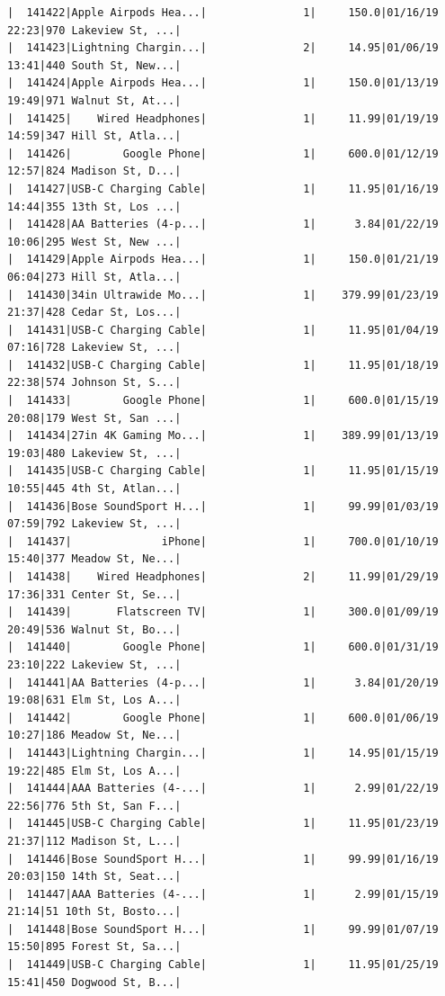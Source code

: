 \documentclass[
  letterpaper,
  DIV=11,
  numbers=noendperiod]{scrartcl}
\begin{document}
\begin{verbatim}
|  141422|Apple Airpods Hea...|               1|     150.0|01/16/19 22:23|970 Lakeview St, ...|
|  141423|Lightning Chargin...|               2|     14.95|01/06/19 13:41|440 South St, New...|
|  141424|Apple Airpods Hea...|               1|     150.0|01/13/19 19:49|971 Walnut St, At...|
|  141425|    Wired Headphones|               1|     11.99|01/19/19 14:59|347 Hill St, Atla...|
|  141426|        Google Phone|               1|     600.0|01/12/19 12:57|824 Madison St, D...|
|  141427|USB-C Charging Cable|               1|     11.95|01/16/19 14:44|355 13th St, Los ...|
|  141428|AA Batteries (4-p...|               1|      3.84|01/22/19 10:06|295 West St, New ...|
|  141429|Apple Airpods Hea...|               1|     150.0|01/21/19 06:04|273 Hill St, Atla...|
|  141430|34in Ultrawide Mo...|               1|    379.99|01/23/19 21:37|428 Cedar St, Los...|
|  141431|USB-C Charging Cable|               1|     11.95|01/04/19 07:16|728 Lakeview St, ...|
|  141432|USB-C Charging Cable|               1|     11.95|01/18/19 22:38|574 Johnson St, S...|
|  141433|        Google Phone|               1|     600.0|01/15/19 20:08|179 West St, San ...|
|  141434|27in 4K Gaming Mo...|               1|    389.99|01/13/19 19:03|480 Lakeview St, ...|
|  141435|USB-C Charging Cable|               1|     11.95|01/15/19 10:55|445 4th St, Atlan...|
|  141436|Bose SoundSport H...|               1|     99.99|01/03/19 07:59|792 Lakeview St, ...|
|  141437|              iPhone|               1|     700.0|01/10/19 15:40|377 Meadow St, Ne...|
|  141438|    Wired Headphones|               2|     11.99|01/29/19 17:36|331 Center St, Se...|
|  141439|       Flatscreen TV|               1|     300.0|01/09/19 20:49|536 Walnut St, Bo...|
|  141440|        Google Phone|               1|     600.0|01/31/19 23:10|222 Lakeview St, ...|
|  141441|AA Batteries (4-p...|               1|      3.84|01/20/19 19:08|631 Elm St, Los A...|
|  141442|        Google Phone|               1|     600.0|01/06/19 10:27|186 Meadow St, Ne...|
|  141443|Lightning Chargin...|               1|     14.95|01/15/19 19:22|485 Elm St, Los A...|
|  141444|AAA Batteries (4-...|               1|      2.99|01/22/19 22:56|776 5th St, San F...|
|  141445|USB-C Charging Cable|               1|     11.95|01/23/19 21:37|112 Madison St, L...|
|  141446|Bose SoundSport H...|               1|     99.99|01/16/19 20:03|150 14th St, Seat...|
|  141447|AAA Batteries (4-...|               1|      2.99|01/15/19 21:14|51 10th St, Bosto...|
|  141448|Bose SoundSport H...|               1|     99.99|01/07/19 15:50|895 Forest St, Sa...|
|  141449|USB-C Charging Cable|               1|     11.95|01/25/19 15:41|450 Dogwood St, B...|

\end{verbatim}
\end{document}

